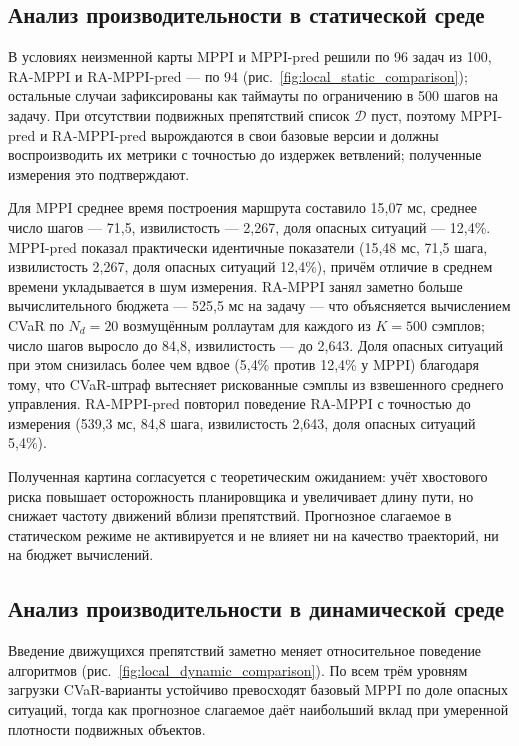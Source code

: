 \documentclass[a4paper,12pt]{extarticle}
\begin{document}
    \subsection{Анализ производительности в статической среде}

    В условиях неизменной карты MPPI и MPPI-pred решили по 96 задач из 100,
    RA-MPPI и RA-MPPI-pred --- по 94 (рис.~\ref{fig:local_static_comparison});
    остальные случаи зафиксированы как таймауты по ограничению в 500 шагов на задачу.
    При отсутствии подвижных препятствий список $\mathcal{D}$ пуст, поэтому MPPI-pred
    и RA-MPPI-pred вырождаются в свои базовые версии и должны воспроизводить их метрики
    с точностью до издержек ветвлений; полученные измерения это подтверждают.

    Для MPPI среднее время построения маршрута составило 15{,}07 мс, среднее число шагов --- 71{,}5,
    извилистость --- 2{,}267, доля опасных ситуаций --- 12{,}4\%.
    MPPI-pred показал практически идентичные показатели (15{,}48 мс, 71{,}5 шага, извилистость 2{,}267,
    доля опасных ситуаций 12{,}4\%), причём отличие в среднем времени укладывается в шум измерения.
    RA-MPPI занял заметно больше вычислительного бюджета --- 525{,}5 мс на задачу --- что
    объясняется вычислением CVaR по $N_d = 20$ возмущённым роллаутам для каждого из $K = 500$
    сэмплов; число шагов выросло до 84{,}8, извилистость --- до 2{,}643. Доля опасных ситуаций
    при этом снизилась более чем вдвое (5{,}4\% против 12{,}4\% у MPPI) благодаря тому,
    что CVaR-штраф вытесняет рискованные сэмплы из взвешенного среднего управления.
    RA-MPPI-pred повторил поведение RA-MPPI с точностью до измерения (539{,}3 мс, 84{,}8 шага,
    извилистость 2{,}643, доля опасных ситуаций 5{,}4\%).

    Полученная картина согласуется с теоретическим ожиданием: учёт хвостового риска повышает
    осторожность планировщика и увеличивает длину пути, но снижает частоту движений вблизи
    препятствий. Прогнозное слагаемое в статическом режиме не активируется и не влияет
    ни на качество траекторий, ни на бюджет вычислений.

    \subsection{Анализ производительности в динамической среде}

    Введение движущихся препятствий заметно меняет относительное поведение алгоритмов
    (рис.~\ref{fig:local_dynamic_comparison}). По всем трём уровням загрузки CVaR-варианты
    устойчиво превосходят базовый MPPI по доле опасных ситуаций, тогда как прогнозное
    слагаемое даёт наибольший вклад при умеренной плотности подвижных объектов.
\end{document}
